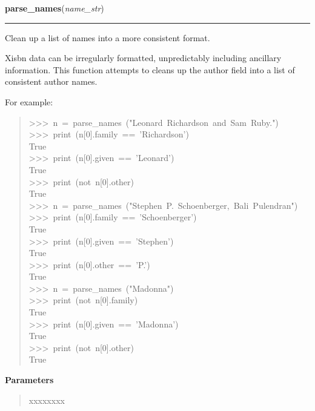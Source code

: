 \hspace{.8\funcindent}\begin{boxedminipage}{\funcwidth}

    \raggedright \textbf{parse\_names}(\textit{name\_str})

    \vspace{-1.5ex}

    \rule{\textwidth}{0.5\fboxrule}
\setlength{\parskip}{2ex}

Clean up a list of names into a more consistent format.

Xisbn data can be irregularly formatted, unpredictably including
ancillary information. This function attempts to cleans up the author field
into a list of consistent author names.

For example:
\begin{quote}{\ttfamily \raggedright \noindent
>{}>{}>~n~=~parse{\_}names~("Leonard~Richardson~and~Sam~Ruby.")~\\
>{}>{}>~print~(n{[}0{]}.family~==~'Richardson')~\\
True~\\
>{}>{}>~print~(n{[}0{]}.given~==~'Leonard')~\\
True~\\
>{}>{}>~print~(not~n{[}0{]}.other)~\\
True~\\
>{}>{}>~n~=~parse{\_}names~("Stephen~P.~Schoenberger,~Bali~Pulendran")~\\
>{}>{}>~print~(n{[}0{]}.family~==~'Schoenberger')~\\
True~\\
>{}>{}>~print~(n{[}0{]}.given~==~'Stephen')~\\
True~\\
>{}>{}>~print~(n{[}0{]}.other~==~'P.')~\\
True~\\
>{}>{}>~n~=~parse{\_}names~("Madonna")~\\
>{}>{}>~print~(not~n{[}0{]}.family)~\\
True~\\
>{}>{}>~print~(n{[}0{]}.given~==~'Madonna')~\\
True~\\
>{}>{}>~print~(not~n{[}0{]}.other)~\\
True
}\end{quote}
\setlength{\parskip}{1ex}
      \textbf{Parameters}
      \vspace{-1ex}

      \begin{quote}
        \begin{Ventry}{xxxxxxxx}


\end{Ventry}
\end{quote}
\end{boxedminipage}
